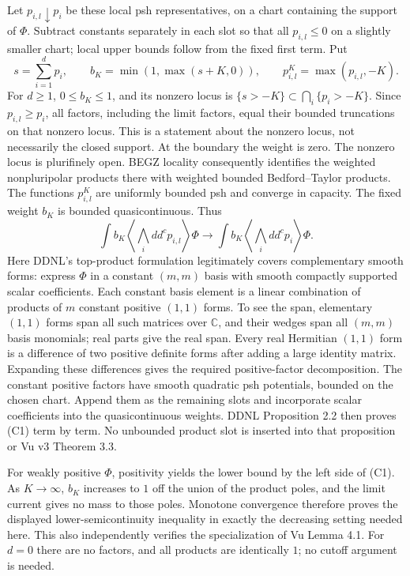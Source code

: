 \documentclass[
  11pt,
]{article}
\begin{document}
Let \(p_{i,l}\downarrow p_i\) be these local psh representatives, on a
chart containing the support of \(\Phi\). Subtract constants separately
in each slot so that all \(p_{i,l}\leq0\) on a slightly smaller chart;
local upper bounds follow from the fixed first term. Put \[
s=\sum_{i=1}^d p_i,\qquad b_K=\min(1,\max(s+K,0)),\qquad p^K_{i,l}=\max(p_{i,l},-K).
\] For \(d\geq1\), \(0\leq b_K\leq1\), and its nonzero locus is
\(\{s>-K\}\subset\bigcap_i\{p_i>-K\}\). Since \(p_{i,l}\geq p_i\), all
factors, including the limit factors, equal their bounded truncations on
that nonzero locus. This is a statement about the nonzero locus, not
necessarily the closed support. At the boundary the weight is zero. The
nonzero locus is plurifinely open. BEGZ locality consequently identifies
the weighted nonpluripolar products there with weighted bounded
Bedford--Taylor products. The functions \(p^K_{i,l}\) are uniformly
bounded psh and converge in capacity. The fixed weight \(b_K\) is
bounded quasicontinuous. Thus \[
\int b_K\left\langle\bigwedge_i dd^cp_{i,l}\right\rangle\Phi
\longrightarrow
\int b_K\left\langle\bigwedge_i dd^cp_i\right\rangle\Phi. \tag{C1}
\] Here DDNL's top-product formulation legitimately covers complementary
smooth forms: express \(\Phi\) in a constant \((m,m)\) basis with smooth
compactly supported scalar coefficients. Each constant basis element is
a linear combination of products of \(m\) constant positive \((1,1)\)
forms. To see the span, elementary \((1,1)\) forms span all such
matrices over \(\mathbb C\), and their wedges span all \((m,m)\) basis
monomials; real parts give the real span. Every real Hermitian \((1,1)\)
form is a difference of two positive definite forms after adding a large
identity matrix. Expanding these differences gives the required
positive-factor decomposition. The constant positive factors have smooth
quadratic psh potentials, bounded on the chosen chart. Append them as
the remaining slots and incorporate scalar coefficients into the
quasicontinuous weights. DDNL Proposition 2.2 then proves (C1) term by
term. No unbounded product slot is inserted into that proposition or Vu
v3 Theorem 3.3.

For weakly positive \(\Phi\), positivity yields the lower bound by the
left side of (C1). As \(K\to\infty\), \(b_K\) increases to \(1\) off the
union of the product poles, and the limit current gives no mass to those
poles. Monotone convergence therefore proves the displayed
lower-semicontinuity inequality in exactly the decreasing setting needed
here. This also independently verifies the specialization of Vu Lemma
4.1. For \(d=0\) there are no factors, and all products are identically
\(1\); no cutoff argument is needed.
\end{document}
